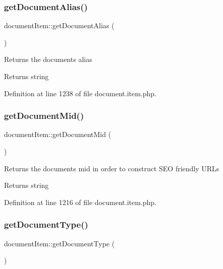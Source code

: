 \subsubsection{\texorpdfstring{get\+Document\+Alias()}{getDocumentAlias()}}
{\footnotesize\ttfamily document\+Item\+::get\+Document\+Alias (\begin{DoxyParamCaption}{ }\end{DoxyParamCaption})}

Returns the document\textquotesingle{}s alias \begin{DoxyReturn}{Returns}
string 
\end{DoxyReturn}


Definition at line 1238 of file document.\+item.\+php.

\hypertarget{classdocumentItem_ae8d90b15c65199e9acb4622b3da43119}{}\label{classdocumentItem_ae8d90b15c65199e9acb4622b3da43119} 
\subsubsection{\texorpdfstring{get\+Document\+Mid()}{getDocumentMid()}}
{\footnotesize\ttfamily document\+Item\+::get\+Document\+Mid (\begin{DoxyParamCaption}{ }\end{DoxyParamCaption})}

Returns the document\textquotesingle{}s mid in order to construct S\+EO friendly U\+R\+Ls \begin{DoxyReturn}{Returns}
string 
\end{DoxyReturn}


Definition at line 1216 of file document.\+item.\+php.

\hypertarget{classdocumentItem_a393ee98eeada92d1bd3b41f5018f746e}{}\label{classdocumentItem_a393ee98eeada92d1bd3b41f5018f746e} 
\subsubsection{\texorpdfstring{get\+Document\+Type()}{getDocumentType()}}
{\footnotesize\ttfamily document\+Item\+::get\+Document\+Type (\begin{DoxyParamCaption}{ }\end{DoxyParamCaption})}

